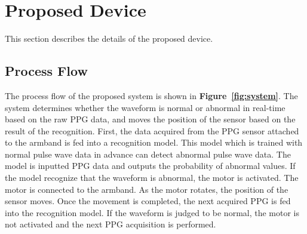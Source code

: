 \documentclass[sigconf, anonymous]{acmart}
\newcommand\figref[1]{\textbf{Figure~\ref{fig:#1}}}
\begin{document}



\section{Proposed Device}
\label{sec:device}
This section describes the details of the proposed device.

\subsection{Process Flow}
The process flow of the proposed system is shown in \figref{system}. The system determines whether the waveform is normal or abnormal in real-time based on the raw PPG data, and moves the position of the sensor based on the result of the recognition. First, the data acquired from the PPG sensor attached to the armband is fed into a recognition model. This model which is trained with normal pulse wave data in advance can detect abnormal pulse wave data. The model is inputted PPG data and outputs the probability of abnormal values. If the model recognize that the waveform is abnormal, the motor is activated. The motor is connected to the armband. As the motor rotates, the position of the sensor moves. Once the movement is completed, the next acquired PPG is fed into the recognition model. If the waveform is judged to be normal, the motor is not activated and the next PPG acquisition is performed.
\end{document}
